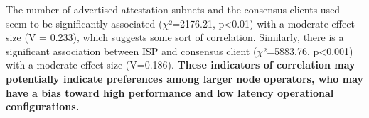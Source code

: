 \documentclass[conference]{IEEEtran}
\begin{document}
The number of advertised attestation subnets and the consensus clients used seem to be significantly associated ($\chi$²=2176.21, p\textless 0.01) with a moderate effect size (V = 0.233), which suggests some sort of correlation. Similarly, there is a significant association between ISP and consensus client ($\chi$²=5883.76, p\textless 0.001) with a moderate effect size (V=0.186). \textbf{These indicators of correlation may potentially indicate preferences among larger node operators, who may have a bias toward high performance and low latency operational configurations.}

\end{document}
